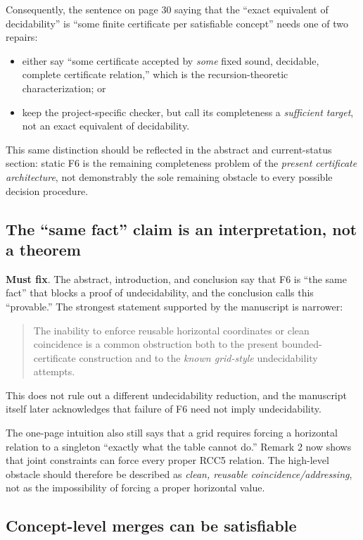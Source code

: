 \documentclass[11pt]{article}
\newcommand{\mustfix}{\textcolor{reviewred}{\textbf{Must fix}}}
\begin{document}
Consequently, the sentence on page 30 saying that the ``exact equivalent of decidability'' is ``some finite certificate per satisfiable concept'' needs one of two repairs:
\begin{itemize}[leftmargin=2em]
  \item either say ``some certificate accepted by \emph{some} fixed sound, decidable, complete certificate relation,'' which is the recursion-theoretic characterization; or
  \item keep the project-specific checker, but call its completeness a \emph{sufficient target}, not an exact equivalent of decidability.
\end{itemize}

This same distinction should be reflected in the abstract and current-status section: static F6 is the remaining completeness problem of the \emph{present certificate architecture}, not demonstrably the sole remaining obstacle to every possible decision procedure.

\subsection{The ``same fact'' claim is an interpretation, not a theorem}

\mustfix. The abstract, introduction, and conclusion say that F6 is ``the same fact'' that blocks a proof of undecidability, and the conclusion calls this ``provable.'' The strongest statement supported by the manuscript is narrower:
\begin{quote}
The inability to enforce reusable horizontal coordinates or clean coincidence is a common obstruction both to the present bounded-certificate construction and to the \emph{known grid-style} undecidability attempts.
\end{quote}
This does not rule out a different undecidability reduction, and the manuscript itself later acknowledges that failure of F6 need not imply undecidability.

The one-page intuition also still says that a grid requires forcing a horizontal relation to a singleton ``exactly what the table cannot do.'' Remark 2 now shows that joint constraints can force every proper RCC5 relation. The high-level obstacle should therefore be described as \emph{clean, reusable coincidence/addressing}, not as the impossibility of forcing a proper horizontal value.

\subsection{Concept-level merges can be satisfiable}
\end{document}
